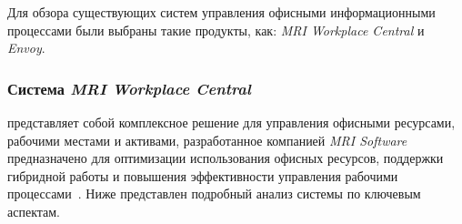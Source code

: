 Для обзора существующих систем управления офисными информационными процессами были выбраны такие продукты, как: \textit{MRI Workplace Central} и \textit{Envoy}.

\subsubsection{Система \textit{MRI Workplace Central} }
\label{ssub:domain:solution-overview:mri}

представляет собой комплексное решение для управления офисными ресурсами, рабочими местами и активами, разработанное компанией \textit{MRI Software} предназначено для оптимизации использования офисных ресурсов, поддержки гибридной работы и повышения эффективности управления рабочими процессами~\cite{web_mri_workplace_central_brochure}. Ниже представлен подробный анализ системы по ключевым аспектам.

